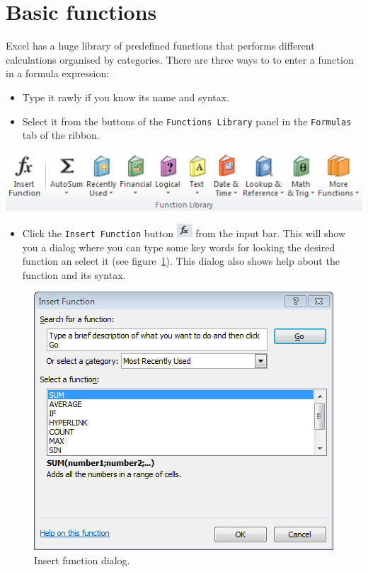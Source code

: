 \section{Basic functions}\hypertarget{basic-functions}{}\label{basic-functions}

Excel has a huge library of predefined functions that performs different calculations organised by categories. There are three ways to to enter a function in a formula expression:

\begin{itemize}
\item Type it rawly if you know its name and syntax.
\item Select it from the buttons of the \texttt{Functions Library} panel in the \texttt{Formulas} tab of the ribbon.
\end{itemize}

\begin{center}
\includegraphics[scale=0.7]{../img/panel_formulas.png}
\end{center}

\begin{itemize}
\item Click the \texttt{Insert Function} button \includegraphics[scale=0.7]{../img/button_insert_function.png} from the
input bar.
This will show you a dialog where you can type some key words for looking the desired function an select it (see
figure~\ref{img-dialog_insert_function}).
This dialog also shows help about the function and its syntax.
\end{itemize}

\begin{figure}[htbp]
\begin{center}
\includegraphics[scale=0.7]{../img/dialog_insert_function.png}
\end{center}
\caption{Insert function dialog.}
\label{img-dialog_insert_function}
\end{figure}

